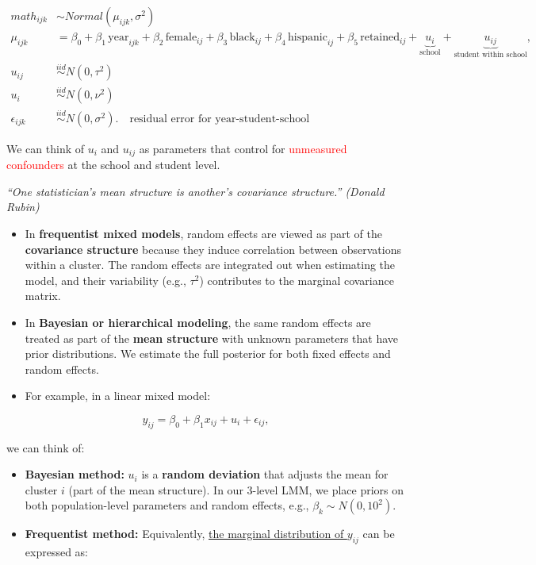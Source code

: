 \documentclass[
  letterpaper,
  DIV=11,
  numbers=noendperiod]{scrreprt}
\begin{document}
\[
\begin{align*}
math_{ijk} & \sim Normal(\mu_{ijk}, \sigma^2)\\
\mu_{ijk} & = \beta_0 + \beta_1 \, \text{year}_{ijk} + \beta_2 \, \text{female}_{ij} + \beta_3 \, \text{black}_{ij} + \beta_4 \, \text{hispanic}_{ij} + \beta_5 \, \text{retained}_{ij} + \underbrace{u_{i}}_{\text{school}}  + \underbrace{u_{ij}}_{\text{student within school}},\\
u_{ij} & \overset{iid}{\sim} N(0, \tau^2)\\
u_i & \overset{iid}{\sim} N(0, \nu^2)\\
\epsilon_{ijk} & \overset{iid}{\sim} N(0, \sigma^2). \quad \text{residual error for year-student-school}
\end{align*}
\]

We can think of \(u_i\) and \(u_{ij}\) as parameters that control for
\textcolor{red}{unmeasured confounders} at the school and student level.

\emph{``One statistician's mean structure is another's covariance
structure.'' (Donald Rubin)}

\begin{itemize}
\item
  In \textbf{frequentist mixed models}, random effects are viewed as
  part of the \textbf{covariance structure} because they induce
  correlation between observations within a cluster. The random effects
  are integrated out when estimating the model, and their variability
  (e.g., \(\tau^2\)) contributes to the marginal covariance matrix.
\item
  In \textbf{Bayesian or hierarchical modeling}, the same random effects
  are treated as part of the \textbf{mean structure} with unknown
  parameters that have prior distributions. We estimate the full
  posterior for both fixed effects and random effects.
\item
  For example, in a linear mixed model:
\end{itemize}

\[
y_{ij} = \beta_0 + \beta_1 x_{ij} + u_i + \epsilon_{ij},
\]

we can think of:

\begin{itemize}
\item
  \textbf{Bayesian method:} \(u_i\) is a \textbf{random deviation} that
  adjusts the mean for cluster \(i\) (part of the mean structure). In
  our 3-level LMM, we place priors on both population-level parameters
  and random effects, e.g., \(\beta_k \sim N(0, 10^2)\).
\item
  \textbf{Frequentist method:} Equivalently, \ul{the marginal
  distribution of \(y_{ij}\)} can be expressed as:
\end{itemize}
\end{document}

